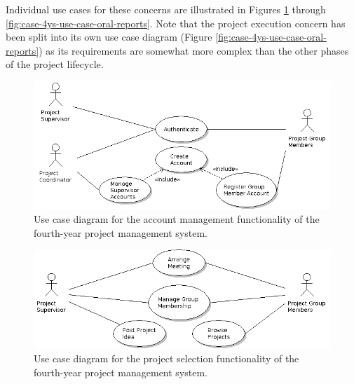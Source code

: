 Individual use cases for these concerns are illustrated in Figures \ref{fig:case-4ys-use-case-account-management} through \ref{fig:case-4ys-use-case-oral-reports}. Note that the project execution concern has been split into its own use case diagram (Figure \ref{fig:case-4ys-use-case-oral-reports}) as its requirements are somewhat more complex than the other phases of the project lifecycle.

\begin{figure}[!ht]
\centering \includegraphics[width=6in]{./img/case-study-fourth-year-system/setup-and-provisioning}
\caption{Use case diagram for the account management functionality of the fourth-year project management system.}
\label{fig:case-4ys-use-case-account-management}
\end{figure}

\begin{figure}[!ht]
\centering \includegraphics[width=6in]{./img/case-study-fourth-year-system/project-selection}
\caption{Use case diagram for the project selection functionality of the fourth-year project management system.}
\label{fig:case-4ys-use-case-project-selection}
\end{figure}

